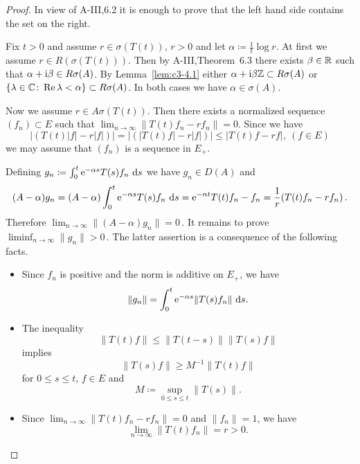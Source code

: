 \begin{proof}
In view of A-III,6.2 it is enough to prove that the left hand
side contains the set on the right.

Fix $t > 0$ and assume $r \in \sigma(T(t))$, $r > 0$ and let $\alpha \coloneqq \frac{1}{t} \log r$.
At first we assume $r \in R(\sigma(T(t)))$.
Then by A-III,Theorem~6.3 there exists
$\beta \in \mathbb{R} $ such that $\alpha+\mathrm{i}\beta \in R\sigma(A)$.
By Lemma~\ref{lem:c3-4.1} either $\alpha+\mathrm{i}\beta\mathbb{Z} \subset R\sigma(A)$
or $\{\lambda \in \mathbb{C}  \colon \mathop{}\!\mathrm{Re}\, \lambda < \alpha\} \subset R\sigma(A)$.
In both cases we have $\alpha \in \sigma(A)$.

Now we assume $r \in A\sigma(T(t))$.
Then there exists a normalized sequence
$(f_n) \subset E$ such that $\lim_{n \to \infty}\|T(t)f_n - rf_n\| = 0$.
Since we have
\[
|(T(t)|f| - r|f|)| = |(|T(t)f| - r|f|)| \leq |T(t)f - rf|, \  (f \in E) 
\]
we may assume that $(f_n)$ is a sequence in $E_+$.

Defining $g_n \coloneqq \int_{0}^{t} \mathrm{e}^{-\alpha s}T(s)f_n \, \mathop{}\!\mathrm{d}{s} $ we have $g_n \in D(A)$ and
\[
(A-\alpha)g_n = (A-\alpha)\int_{0}^{t} \mathrm{e}^{-\alpha s}T(s)f_n \, \mathop{}\!\mathrm{d}{s} = \mathrm{e}^{-\alpha t}T(t)f_n - f_n = \frac{1}{r}(T(t)f_n - rf_n)\,.
\]
Therefore $\lim_{n \to \infty}\|(A - \alpha) g_n\| = 0$\,. It remains to prove 
$\liminf_{n \to \infty}\|g_n\| > 0$\,.
The latter assertion is a consequence of the following facts.
\begin{itemize}
	\item
	Since $f_n$ is positive and the norm is additive on $E_+$,
	we have
	\[
    \|g_n\| = \int_{0}^{t} \mathrm{e}^{-\alpha s}\|T(s)f_n\| \, \mathop{}\!\mathrm{d}{s}.
    \]
	
	\item 
    The inequality  
    \[
    \|T(t)f\| \leq \|T(t-s)\|\|T(s)f\|
    \]
    implies
	\[
    \|T(s)f\| \geq M^{-1}\|T(t)f\|
    \]
    for $0 \leq s \leq t$, $f \in E$ and 
    \[
    M \coloneqq \sup_{0 \leq s \leq t}\|T(s)\|.
    \]
	 
	 \item 
	 Since $\lim_{n \to \infty}\|T(t)f_n - rf_n\| = 0$ and $\|f_n\| = 1$, we have
	 \[
     \lim_{n \to \infty}\|T(t)f_n\| = r > 0.
     \]
     
\end{itemize}
\end{proof}
%

